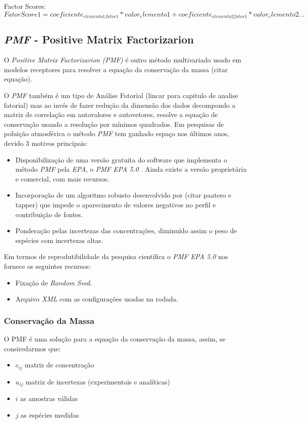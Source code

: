 Factor Scores: 
\begin{equation}
FatorScore1 = coeficiente_{elemento1 fator1}*valor_elemento1 + coeficiente_{elemento2 fator1}*valor_elemento2 ...
\end{equation} 

\subsection{\textit{PMF} - Positive Matrix Factorizarion}

O \textit{Positive Matrix Factorizarion (PMF)} é outro método multivariado usado
em modelos receptores para resolver a equação da conservação da massa 
(citar equação). 

O \textit{PMF} também é um tipo de Análise Fatorial (lincar para capitulo de analise fatorial)
mas ao invés de fazer redução da dimensão dos dados decompondo a matriz de 
correlação em autovalores e autovetores, resolve a equação de conservação 
usando a resolução por mínimos quadrados. Em pesquisas de poluição atmosférica 
o método \textit{PMF} tem ganhado espaço nos últimos anos, devido 3 motivos 
principais:

\begin{itemize}
  \item Disponibilização de uma versão gratuita do software que implementa 
        o método \textit{PMF} pela \textit{EPA}, o \textit{PMF EPA 5.0} 
        \citep{Norris:2014}. 
        Ainda existe a versão proprietária e comercial, com mais recursos.   
  \item Incorporação de um algoritmo robusto desenvolvido por (citar paatero e tapper) 
        que impede o aparecimento de valores negativos no perfil e 
        contribuição de fontes.
  \item Ponderação pelas incertezas das concentrações, diminuído assim o peso 
        de espécies com incertezas altas.
\end{itemize}  

Em termos de reprodutibilidade da pesquisa científica o \textit{PMF EPA 5.0} 
nos fornece os seguintes recursos:

\begin{itemize}
  \item Fixação de \textit{Random Seed}.
  \item Arquivo \textit{XML} com as configurações usadas na rodada. 
\end{itemize} 

\subsubsection{Conservação da Massa}
O PMF é uma solução para a equação da conservação da massa, assim, se 
consiredarmos que:
\begin{itemize}
  \item $c_{ij}$ matriz de concentração
  \item $u_{ij}$ matriz de incertezas (experimentais e analíticas)
  \item $i$ as amostras válidas
  \item $j$ as espécies medidas
\end{itemize}


